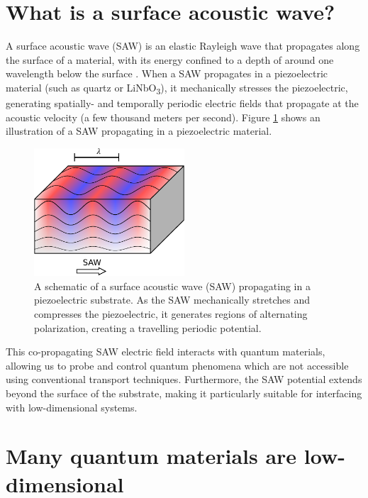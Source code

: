 \documentclass{beavtex_dub_edit}
\begin{document}
\section{What is a surface acoustic wave?}

A surface acoustic wave (SAW) is an elastic Rayleigh wave that propagates along the surface of a material, with its energy confined to a depth of around one wavelength below the surface \cite{rayleigh_waves_1885}. When a SAW propagates in a piezoelectric material (such as quartz or LiNbO\textsubscript{3}), it mechanically stresses the piezoelectric, generating spatially- and temporally periodic electric fields that propagate at the acoustic velocity (a few thousand meters per second). Figure \ref{SAW intro fig} shows an illustration of a SAW propagating in a piezoelectric material. 

\begin{figure}
    \includegraphics[width = 0.5\textwidth]{SAW intro fig.pdf}
    \caption[A schematic of a surface acoustic wave (SAW) propagating in a piezoelectric substrate.]{A schematic of a surface acoustic wave (SAW) propagating in a piezoelectric substrate. As the SAW mechanically stretches and compresses the piezoelectric, it generates regions of alternating polarization, creating a travelling periodic potential.}
    \label{SAW intro fig}
\end{figure}

This co-propagating SAW electric field interacts with quantum materials, allowing us to probe and control quantum phenomena which are not accessible using conventional transport techniques. Furthermore, the SAW potential extends beyond the surface of the substrate, making it particularly suitable for interfacing with low-dimensional systems.


\section{Many quantum materials are low-dimensional}
\end{document}
